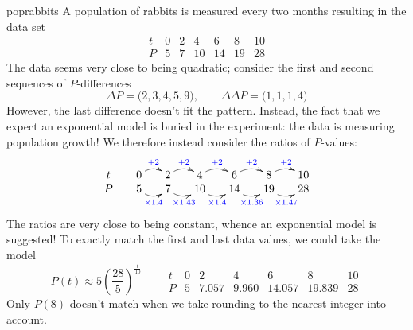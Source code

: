 \begin{example}{}{poprabbits}
	A population of rabbits is measured every two months resulting in the data set
	\[
		\begin{array}{c|cccccc}
			t&0&2&4&6&8&10\\\hline
			P&5&7&10&14&19&28
		\end{array}
	\]
	The data seems very close to being quadratic; consider the first and second sequences of $P$-differences
	\[
		\Delta P=\bigl(2,3,4,5,9\bigr),\qquad \Delta\Delta P=\bigl(1,1,1,4\bigr)
	\]
	However, the last difference doesn't fit the pattern. Instead, the fact that we expect an exponential model is buried in the experiment: the data is measuring population growth! We therefore instead consider the ratios of $P$-values:
	\[
		\xymatrix @R0pt @C15pt{
			t & 0 \ar@/^/[r]^{\textcolor{blue}{+2}} & 2 \ar@/^/[r]^{\textcolor{blue}{+2}} & 4 \ar@/^/[r]^{\textcolor{blue}{+2}} & 6 \ar@/^/[r]^{\textcolor{blue}{+2}} & 8 \ar@/^/[r]^{\textcolor{blue}{+2}} & 10\\
			P & 5 \ar@/_/[r]_{\textcolor{blue}{\times 1.4}} & 7 \ar@/_/[r]_{\textcolor{blue}{\times 1.43}} & 10 \ar@/_/[r]_{\textcolor{blue}{\times 1.4}} & 14 \ar@/_/[r]_{\textcolor{blue}{\times 1.36}} & 19 \ar@/_/[r]_{\textcolor{blue}{\times 1.47}} & 28
		}
	\]
	The ratios are very close to being constant, whence an exponential model is suggested! To exactly match the first and last data values, we could take the model
	\[
		P(t)\approx 5\left(\frac{28}5\right)^{\frac t{10}}\qquad
		\begin{array}{c|cccccc}
			t&0&2&4&6&8&10\\\hline
			P&5&7.057&9.960&14.057&19.839&28
		\end{array}
	\]
	Only $P(8)$ doesn't match when we take rounding to the nearest integer into account.
\end{example}


